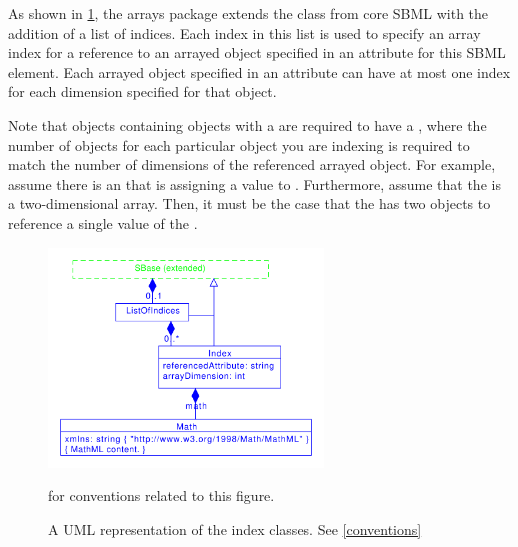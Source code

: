 As shown in \ref{fig:indices_uml}, the arrays package extends the \SBase class from core SBML with the addition of a list of indices.   Each index in this list is used to specify an array index for a reference to an arrayed object specified in an attribute for this SBML element.       Each arrayed object specified in an attribute can have at most one index for each dimension specified for that object.    

Note that \SBase objects containing   objects with a
\ListOfDimensions are required to have  a \ListOfIndices, where the number of
  \Index objects for each particular object you are indexing is required
  to match the number of dimensions of the referenced arrayed
  object. For example, assume there is an \AssignmentRule that is
  assigning a value to \Parameter. Furthermore, assume that
  the \Parameter is a two-dimensional array.  Then, it must be the case
  that the \Rule has two \Index objects to reference a single value of
  the \Parameter. 
\begin{figure}[tbhp]
    \centering
    \includegraphics[width=0.65\textwidth]{images/indicesUML.pdf}\\
    \caption{A UML representation of the index classes. See \ref{conventions}} for conventions related to this figure.  \label{fig:indices_uml}
\end{figure}

